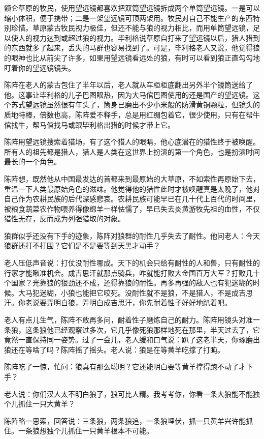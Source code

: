 \par 额仑草原的牧民，使用望远镜都喜欢把双筒望远镜拆成两个单筒望远镜。一是可以缩小体积，便于携带；二是一架望远镜可顶两架用。牧民对自己不能生产的东西特别珍惜。草原蒙古牧民视力极佳，但还不能与狼的视力相比，而用单筒望远镜，足以使人的视力达到或超过狼的视力。毕利格说草原自打来了望远镜以后，猎人猎到的东西就多了起来，丢失的马群也容易找到了。可是，毕利格老人又说，他觉得狼的眼神也比从前尖了许多，如果用望远镜看远处的狼，有时可以看到狼正直勾勾地盯着你的望远镜镜头。
\par 陈阵在老人的蒙古包住了半年以后，老人就从车柜柜底翻出另外半个镜筒送给了他。这事让毕利格的儿子巴图眼热，因为大马倌巴图使用的还是国产的望远镜。这个苏式望远镜虽然很有年头了，筒身已磨出不少小米般的防滑黄铜颗粒，但镜头的质地特棒，倍数也高，陈阵爱不释手，总是用红绸包着它，很少使用，只有在帮牛倌找牛，帮马倌找马或跟毕利格出猎的时候才带上它。
\par 陈阵用望远镜搜索着猎场，有了这个猎人的眼睛，他心底潜在的猎性终于被唤醒。所有人的祖先都是猎人，猎人是人类在这世界上扮演的第一个角色，也是扮演时间最长的一个角色。
\par 陈阵想，既然他从中国最发达的首都来到最原始的大草原，不如索性再原始下去，重温一下人类最原始角色的滋味。他觉得他的猎性此时才被唤醒真是太晚了，他对自己作为农耕民族的后代深感悲哀。农耕民族可能早已在几十代上百代的时间里，被粮食蔬菜农作物喂养得像绵羊一样怯懦了，早已失去炎黄游牧先祖的血性，不仅猎性无存，反而成为列强猎取的对象。
\par 狼群似乎还没有下手的迹象，陈阵对狼群的耐性几乎失去了耐性。他问老人：今天狼群还打不打围？它们是不是要等到天黑才动手？
\par 老人压低声音说：打仗没耐性哪成。天下的机会只给有耐性的人和兽，只有耐性的行家才能瞅准机会。成吉思汗就那点骑兵，咋就能打败大金国百万大军？打败几十个国家？光靠狼的狠劲还不成，还得靠狼的耐性。再多再强的敌人也有犯迷糊的时候。大马犯迷糊，小狼也能把它咬死。没耐性就不是狼，不是猎人，不是成吉思汗。你老说要弄明白狼，弄明白成吉思汗，你先耐着性子好好地趴着吧。
\par 老人有点儿生气，陈阵不敢再多问，耐着性子磨炼自己的耐力。陈阵用镜头对准一条狼，这条狼他已经观察过多次，它几乎像死狼那样地死在那里，半天过去了，它竟然一直保持同一姿势。过了一会儿，老人缓和口气说：趴了这老半天，你琢磨出狼还在等啥了吗？陈阵摇了摇头。老人说：狼是在等黄羊吃撑了打盹。
\par 陈阵吃了一惊，忙问：狼真有那么聪明？它还能明白要等黄羊撑得跑不动了才下手？
\par 老人说：你们汉人太不明白狼了，狼可比人精。我考考你，你看一条大狼能不能独个儿抓住一只大黄羊？
\par 陈阵略一思索，回答说：三条狼，两条狼追，一条狼埋伏，抓一只黄羊兴许能抓住。一条狼想独个儿抓住一只黄羊根本不可能。

